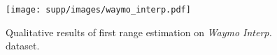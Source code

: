\begin{figure}[t]
\centering
\texttt{[image: supp/images/waymo\_interp.pdf]}

\caption{Qualitative results of first range estimation on \textit{Waymo Interp.} dataset.}
\label{fig:supp_waymo_interp}

\end{figure}